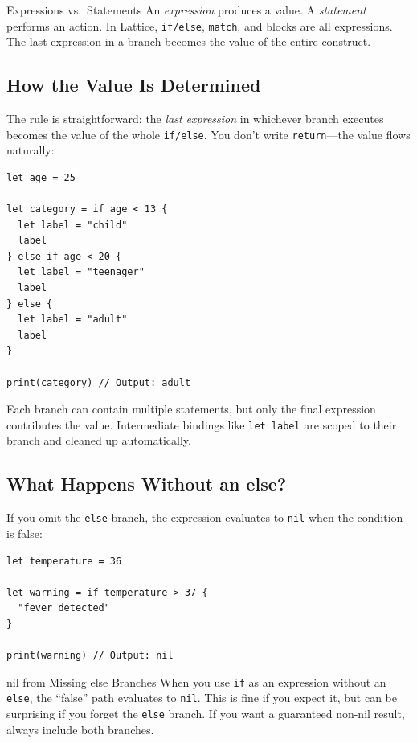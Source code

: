 \begin{defnbox}{Expressions vs.\ Statements}
An \emph{expression} produces a value. A \emph{statement} performs an action. In Lattice, \lstinline|if/else|, \lstinline|match|, and blocks are all expressions. The last expression in a branch becomes the value of the entire construct.
\end{defnbox}

\subsection{How the Value Is Determined}\label{sec:if-else-value}

The rule is straightforward: the \emph{last expression} in whichever branch executes becomes the value of the whole \lstinline|if/else|. You don't write \lstinline|return|---the value flows naturally:

\begin{lstlisting}[language=Lattice, caption={Multi-line branches still produce values}]
let age = 25

let category = if age < 13 {
  let label = "child"
  label
} else if age < 20 {
  let label = "teenager"
  label
} else {
  let label = "adult"
  label
}

print(category) // Output: adult
\end{lstlisting}

Each branch can contain multiple statements, but only the final expression contributes the value. Intermediate bindings like \lstinline|let label| are scoped to their branch and cleaned up automatically.

\subsection{What Happens Without an else?}\label{sec:if-without-else}

If you omit the \lstinline|else| branch, the expression evaluates to \lstinline|nil| when the condition is false:

\begin{lstlisting}[language=Lattice, caption={Missing else produces nil}]
let temperature = 36

let warning = if temperature > 37 {
  "fever detected"
}

print(warning) // Output: nil
\end{lstlisting}

\begin{warnbox}{nil from Missing else Branches}
When you use \lstinline|if| as an expression without an \lstinline|else|, the ``false'' path evaluates to \lstinline|nil|. This is fine if you expect it, but can be surprising if you forget the \lstinline|else| branch. If you want a guaranteed non-nil result, always include both branches.
\end{warnbox}

